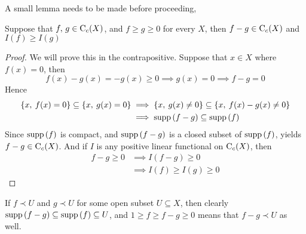 \documentclass[../../main.tex]{subfiles}
\begin{document}
A small lemma needs to be made before proceeding,
    \begin{lemma}\label{lemma I is monotonic}
        Suppose that $f,\, g\in\operatorname{C}_c({X})$, and $f\geq g\geq 0$ for every $X$, then $f-g\in\operatorname{C}_c({X})$ and $I(f)\geq I(g)$
    \end{lemma}
    \begin{proof}
        We will prove this in the contrapositive. Suppose that $x\in X$ where $f(x) = 0$, then
        \[
        f(x)-g(x) = -g(x)\geq 0\implies g(x)=0\implies f-g=0
        \]
        Hence
        \begin{align*}
            \left\{x,\:f(x)=0\right\}\subseteq\left\{x,\:g(x)=0\right\}&\implies \left\{x,\:g(x)\neq0\right\}\subseteq \left\{x,\:f(x)-g(x)\neq0\right\}\\
            &\implies \operatorname{supp}{(f-g)}\subseteq \operatorname{supp}{(f)}
        \end{align*}
        Since $\operatorname{supp}{(f)}$ is compact, and $\operatorname{supp}{(f-g)}$ is a closed subset of $\operatorname{supp}{(f)}$, yields $f-g\in\operatorname{C}_c({X})$. And if $I$ is any positive linear functional on $\operatorname{C}_c({X})$, then
        \begin{align*}
            f-g\geq 0&\implies I(f-g)\geq 0\\
            &\implies I(f)\geq I(g)\geq 0
        \end{align*}
    \end{proof}
\remark If $f\prec U$ and $g\prec U$ for some open subset $U\subseteq X$, then clearly $\operatorname{supp}{(f-g)}\subseteq \operatorname{supp}{(f)}\subseteq U$, and $1\geq f\geq f-g\geq 0$ means that $f-g\prec U$ as well.
\end{document}
